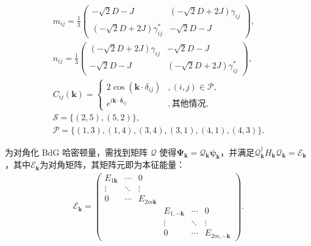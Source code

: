         \begin{gather}
            m_{ij} =\frac{1}{3}
            \begin{pmatrix}
            -\sqrt{2} D-J & \left( -\sqrt{2} D +2J\right) \gamma _{ij}\\
            \left( -\sqrt{2} D +2J\right) \gamma _{ij}^{*} & -\sqrt{2} D-J
            \end{pmatrix},\\
            n_{ij} =\frac{1}{3}
            \begin{pmatrix}
            \left( -\sqrt{2} D +2J\right) \gamma _{ij} & -\sqrt{2} D-J\\
            -\sqrt{2} D-J & \left( -\sqrt{2} D +2J\right) \gamma _{ij}^{*}
            \end{pmatrix},\\
            C_{ij}({\bm{k}}) =
            \begin{cases}
            2\cos({\bm{k}} \cdot \delta _{ij}) & ,( i,j) \in \mathcal{P},\\
            e^{i{\bm{k}} \cdot \bm{\delta }_{ij}} & ,\text{其他情况},
            \end{cases}\\
            \mathcal{S}=\{(2,5),(5,2)\},\\
            \mathcal{P}=\{( 1,3) ,( 1,4) ,( 3,4),(3,1),(4,1),(4,3)\}.
        \end{gather}

        为对角化 BdG 哈密顿量，需找到矩阵 $\mathcal{Q}$ 使得$\bm{\Psi}_{{\bm{k}}}=\mathcal{Q}_{{\bm{k}}}\bm{\psi}_{{\bm{k}}}$，并满足$\mathcal{Q}_{{\bm{k}}}^\dagger H_{{\bm{k}}} \mathcal{Q}_{{\bm{k}}}=\mathcal{E}_{{\bm{k}}}$，其中$\mathcal{E}_{{\bm{k}}}$为对角矩阵，其矩阵元即为本征能量：
        \begin{align}
            \mathcal{E}_{{\bm{k}}}=
            \begin{pmatrix}
                E _{1{\bm{k}}} & \cdots & 0 &   &   & \\
                \vdots & \ddots & \vdots & & &\\
                0 & \cdots & E _{2m{\bm{k}}} &   &  &\\
                & & & E_{1,-{\bm{k}}}&\cdots  & 0 \\
                & & & \vdots & \ddots  & \vdots\\
                & & & 0 &\cdots & E_{2m,-{\bm{k}}}
            \end{pmatrix}.
        \end{align}

